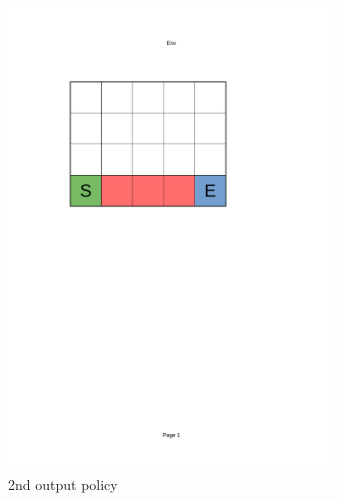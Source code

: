 \begin{figure}[!ht]
\begin{subfigure}{0.24\textwidth}
            \includegraphics[page=8, trim = 40mm 40mm 70mm 165mm, clip, width=0.95\textwidth]{figures/personal_work/policies.pdf}
        \caption{2nd output policy}
    \end{subfigure}
        \centering
    \begin{subfigure}{0.24\textwidth}
        \centering

\end{subfigure}
\end{figure}
